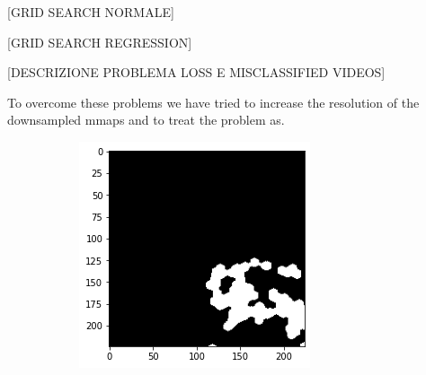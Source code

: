\documentclass[10pt,twocolumn,hidelinks,letterpaper]{article}
\begin{document}
[GRID SEARCH NORMALE]

[GRID SEARCH REGRESSION]

[DESCRIZIONE PROBLEMA LOSS E MISCLASSIFIED VIDEOS]

To overcome these problems we have tried to increase the resolution of the downsampled mmaps and to treat the problem as.

\begin{figure}
	\centering

	\begin{subfigure}{.4\linewidth}
		\includegraphics[width=\linewidth]{images/mmaps_example/downsampling224x224_bw.png}
	\end{subfigure}
  \begin{subfigure}{.59\linewidth}
    \begin{subfigure}{.325\linewidth}

\end{subfigure}
\end{subfigure}
\end{figure}
\end{document}
